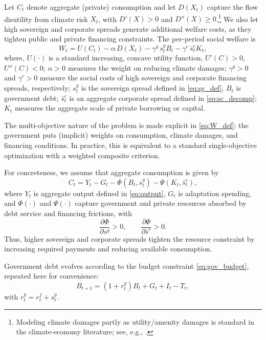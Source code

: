 \documentclass[12pt]{article}
\begin{document}
Let $C_t$ denote aggregate (private) consumption and let $D(X_t)$ capture
the flow disutility from climate risk $X_t$, with $D'(X) > 0$ and
$D''(X) \ge 0$.\footnote{
Modeling climate damages partly as utility/amenity damages is standard in the climate-economy literature; see, e.g., \citet{Barrage2020}.} We also let high sovereign and corporate spreads generate
additional welfare costs, as they tighten public and private financing
constraints. The per-period social welfare is
\begin{equation}
  W_t
  =
  U(C_t)
  - \alpha\, D(X_t)
  - \gamma^g\, s^g_t B_t
  - \gamma^c\, \bar{s}^c_t K_t,
  \label{eq:W_def}
\end{equation}
where, $U(\cdot)$ is a standard increasing, concave utility function,
        $U'(C) > 0$, $U''(C) < 0$;
$\alpha > 0$ measures the weight on reducing climate damages;
$\gamma^g > 0$ and $\gamma^c > 0$ measure the social costs of high
        sovereign and corporate financing spreads, respectively;
$s^g_t$ is the sovereign spread defined in \eqref{eq:sg_def},
        $B_t$ is government debt;
$\bar{s}^c_t$ is an aggregate corporate
        spread defined in \eqref{eq:sc_decomp}; $K_t$ measures the aggregate scale of private borrowing or capital.


The multi-objective nature of the problem is made explicit in
\eqref{eq:W_def}: the government puts (implicit) weights on consumption,
climate damages, and financing conditions. In practice, this is equivalent
to a standard single-objective optimization with a weighted composite
criterion.


For concreteness, we assume that aggregate consumption is given by
\begin{equation}
  C_t
  =
  Y_t
  - G_t
  - \Phi(B_t, s^g_t)
  - \Psi(K_t, \bar{s}^c_t),
  \label{eq:C_def}
\end{equation}
where $Y_t$ is aggregate output defined in \eqref{eq:output}, $G_t$ is
adaptation spending, and $\Phi(\cdot)$ and $\Psi(\cdot)$ capture
government and private resources absorbed by debt service and financing
frictions, with
\[
  \frac{\partial \Phi}{\partial s^g} > 0, \qquad
  \frac{\partial \Psi}{\partial \bar{s}^c} > 0.
\]
Thus, higher sovereign and corporate spreads tighten the resource
constraint by increasing required payments and reducing available
consumption.

Government debt evolves according to the budget constraint
\eqref{eq:gov_budget}, repeated here for convenience:
\begin{equation}
  B_{t+1} = (1 + r^g_t) B_t + G_t + I_t - T_t,
  \label{eq:gov_budget_repeat}
\end{equation}
with $r^g_t = r^f_t + s^g_t$.
\end{document}
